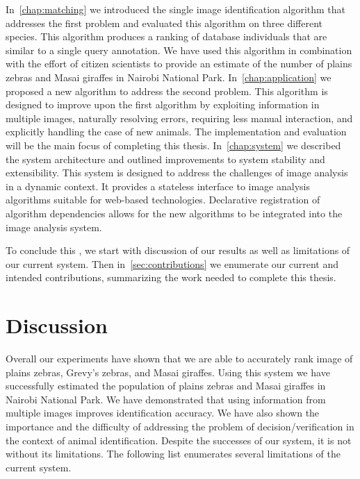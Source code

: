     In~\cref{chap:matching} we introduced the single image identification
      algorithm that addresses the first problem and evaluated this algorithm on
      three different species.
    This algorithm produces a ranking of database individuals that are similar
      to a single query annotation.
    We have used this algorithm in combination with the effort of citizen
      scientists to provide an estimate of the number of plains zebras and Masai
      giraffes in Nairobi National Park.
    In~\cref{chap:application} we proposed a new algorithm to address the
      second problem.
    This algorithm is designed to improve upon the first algorithm by
      exploiting information in multiple images, naturally resolving errors,
      requiring less manual interaction, and explicitly handling the case of new
      animals.
    The implementation and evaluation will be the main focus of completing
      this thesis.
    In~\cref{chap:system} we described the system architecture and outlined
      improvements to system stability and extensibility.
    This system is designed to address the challenges of image analysis in a
      dynamic context.
    It provides a stateless interface to image analysis algorithms suitable
      for web-based technologies.
    Declarative registration of algorithm dependencies allows for the new
      algorithms to be integrated into the image analysis system.

    To conclude this \thesis{}, we start with discussion of our results as
      well as limitations of our current system.
    Then in~\cref{sec:contributions} we enumerate our current and intended
      contributions, summarizing the work needed to complete this thesis.

    \section{Discussion}\label{sec:discussresult} 

        Overall our experiments have shown that we are able to accurately rank
          image of plains zebras, Grevy's zebras, and Masai giraffes.
        Using this system we have successfully estimated the population of
          plains zebras and Masai giraffes in Nairobi National Park.
        We have demonstrated that using information from multiple images
          improves identification accuracy.
        We have also shown the importance and the difficulty of addressing the
          problem of decision/verification in the context of animal
          identification.
        Despite the successes of our system, it is not without its
          limitations.
        The following list enumerates several limitations of the current
          system.

